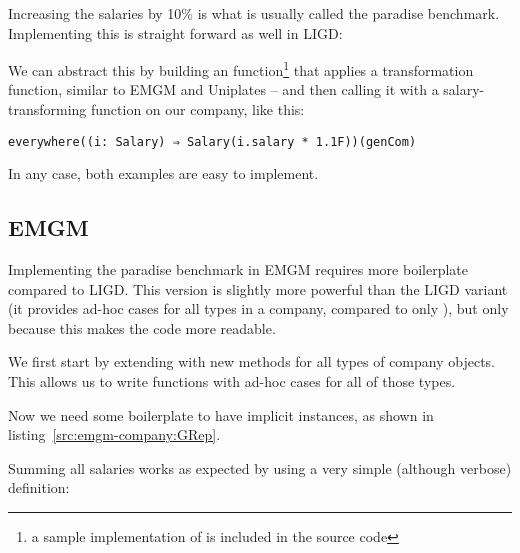 \begin{example}

Increasing the salaries by 10\% is what is usually called the paradise
benchmark. Implementing this is straight forward as well in LIGD:



We can abstract this by building an  function\footnote{a sample implementation of  is included in the source code} that applies
a transformation function, similar to EMGM and Uniplates  -- and
then calling it with a salary-transforming function on our company,
like this:
\begin{lstlisting}[caption=Increase the salaries using \cd{everywhere}]
  everywhere((i: Salary) ⇒ Salary(i.salary * 1.1F))(genCom)
\end{lstlisting}

\end{example}

In any case, both examples are easy to implement.


\subsection{EMGM}

Implementing the paradise benchmark in EMGM requires more boilerplate compared
to LIGD. This version is slightly more powerful than the LIGD variant (it
provides ad-hoc cases for all types in a company, compared to only ),
but only because this makes the code more readable.

We first start by extending  with new methods for all types of
company objects. This allows us to write functions with ad-hoc cases for all
of those types.



Now we need some boilerplate to have implicit  instances, as shown
in listing~\ref{src:emgm-company:GRep}.


\begin{example}
Summing all salaries works as expected by using a very simple (although
verbose) definition:

\end{example}

